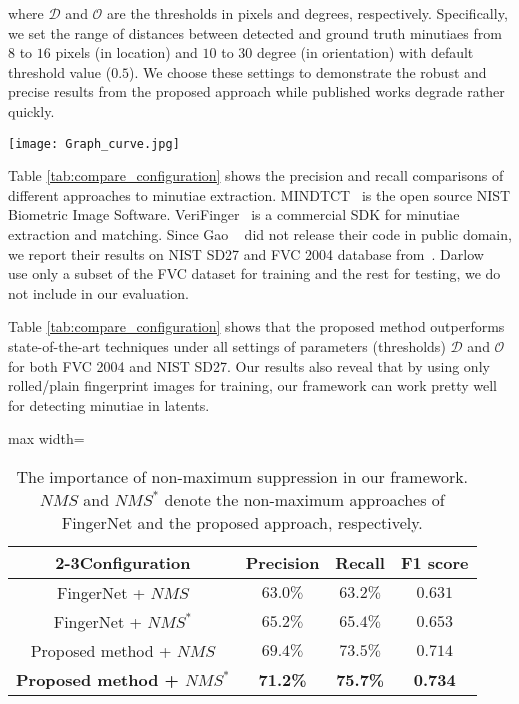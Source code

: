 \documentclass[10pt,twocolumn,letterpaper]{article}
\begin{document}
where $\mathcal{D}$ and $\mathcal{O}$ are the thresholds in pixels and degrees, respectively.
Specifically, we set the range of distances between detected and ground truth minutiaes from $8$ to $16$ pixels (in location) and $10$ to $30$ degree (in orientation) with default threshold value ($0.5$). We choose these settings to demonstrate the robust and precise results from the proposed approach while published works degrade rather quickly.

\begin{figure*}[tbp]
\centering
\texttt{[image: Graph\_curve.jpg]}
\caption{Precision-Recall curves on FVC 2004 (left) and NIST SD27 (right) datasets with published approaches in Setting 3.}
\label{fig:Graph_curve}
\end{figure*}
	
Table \ref{tab:compare_configuration} shows the precision and recall comparisons of different approaches to minutiae extraction. MINDTCT~\cite{ko2007user} is the open source NIST Biometric Image Software. VeriFinger~\cite{verifinger2010neuro} is a commercial SDK for minutiae extraction and matching. Since Gao \etal~\cite{gao2010novel} did not release their code in public domain, we report their results on NIST SD27 and FVC 2004 database from~\cite{tang2017FingerNet}. Darlow \etal~\cite{Darlow2017DeepLearn} use only a subset of the FVC dataset for training and the rest for testing, we do not include in our evaluation.

Table \ref{tab:compare_configuration} shows that the proposed method outperforms state-of-the-art techniques under all settings of parameters (thresholds) $\mathcal{D}$ and $\mathcal{O}$ for both FVC 2004 and NIST SD27. Our results also reveal that by using only rolled/plain fingerprint images for training, our framework can work pretty well for detecting minutiae in latents.

\begin{table}[!tp]
	\centering
	\caption{The importance of non-maximum suppression in our framework. $NMS$ and $NMS^*$ denote the non-maximum approaches of FingerNet and the proposed approach, respectively.}    
	\label{tab:NMS}
	\begin{small}
	\begin{adjustbox}{max width=\textwidth}
		\begin{tabular}{|c|c|c|c|}
			\hline
			\cline{2-3}{\bfseries Configuration}& {\bfseries Precision}& {\bfseries Recall}& {\bfseries F1 score}\\
			\hline{FingerNet + $NMS$}	&$63.0\%$&$63.2\%$&$0.631$\\{FingerNet + $NMS^*$}	&$65.2\%$&$65.4\%$&$0.653$\\{Proposed method + $NMS$}	&	$69.4\%$&	$73.5\%$&$0.714$\\{\bfseries Proposed method + $NMS^*$}	&{\bfseries 71.2\%}&{\bfseries 75.7\%}&{\bfseries 0.734}\\
			\hline
		\end{tabular}
		\end{adjustbox}
	\end{small}
\end{table}
\end{document}
